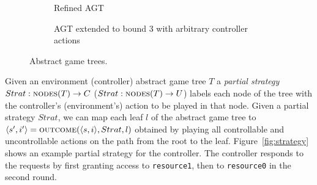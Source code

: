 \documentclass{llncs}
\begin{document}
\begin{figure}
\begin{subfigure}[t]{.25\textwidth}
        \captionsetup{width=.8\textwidth}
        \caption{Refined AGT}
        \label{fig:refined}
    \end{subfigure}%
    \begin{subfigure}[t]{.25\textwidth}
        \centering
        \captionsetup{width=.8\textwidth}
        \caption{AGT extended to bound 3 with arbitrary controller actions}
        \label{fig:extended}
    \end{subfigure}
    \caption{Abstract game trees.}
    \label{fig:alltrees}
\end{figure}

Given an environment (controller) abstract game tree $T$ a \emph{partial
strategy} $Strat: \textsc{nodes}(T) \rightarrow C$ ($Strat: \textsc{nodes}(T)
\rightarrow U$) labels each node of the tree with the controller's
(environment's) action to be played in that node.   Given a partial strategy
$Strat$, we can map each leaf $l$ of the abstract game tree to $\langle
s',i'\rangle=\textsc{outcome}(\langle s, i\rangle, Strat, l)$ obtained by
playing all controllable and uncontrollable actions on the path from the root
to the leaf.  Figure~\ref{fig:strategy} shows an example partial strategy for
the controller.  The controller responds to the requests by first granting
access to \texttt{resource1}, then to \texttt{resource0} in the second round.
\end{document}
